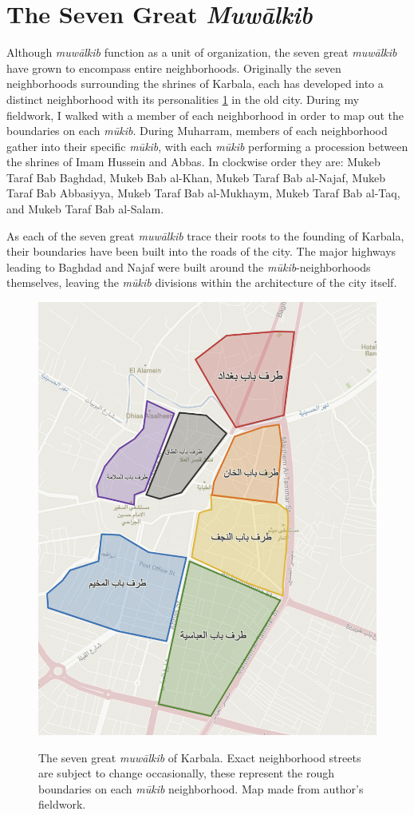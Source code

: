 \section{The Seven Great \emph{Muwālkib}} \label{seven-great-mokwebs}
Although \emph{muwālkib} function as a unit of organization, the seven great \emph{muwālkib} have grown to encompass entire neighborhoods. Originally the seven neighborhoods surrounding the shrines of Karbala, each has developed into a distinct neighborhood with its personalities \ref{fig:mowalkib} in the old city. During my fieldwork, I walked with a member of each neighborhood in order to map out the boundaries on each \emph{mūkib}. During Muharram, members of each neighborhood gather into their specific \emph{mūkib}, with each \emph{mūkib} performing a procession between the shrines of Imam Hussein and Abbas. In clockwise order they are:  Mukeb Taraf Bab Baghdad, Mukeb Bab al-Khan, Mukeb Taraf Bab al-Najaf, Mukeb Taraf Bab Abbasiyya, Mukeb Taraf Bab al-Mukhaym, Mukeb Taraf Bab al-Taq, and Mukeb Taraf Bab al-Salam.

As each of the seven great \emph{muwālkib} trace their roots to the founding of Karbala, their boundaries have been built into the roads of the city. The major highways leading to Baghdad and Najaf were built around the \emph{mūkib}-neighborhoods themselves, leaving the \emph{mūkib} divisions within the architecture of the city itself. 

\begin{figure}[H]
\caption{The seven great \emph{muwālkib} of Karbala. Exact neighborhood streets are subject to change occasionally, these represent the rough boundaries on each \emph{mūkib} neighborhood. Map made from author's fieldwork.}
\centering
\includegraphics[height=0.75\textwidth]{images/seven-mowkebs.png}
\label{fig:mowalkib}
\end{figure}

